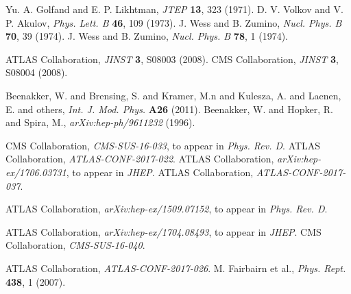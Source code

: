 \documentclass{ws-ijmpcs}
\begin{document}
\begin{thebibliography}{0}    %

 Yu. A. Golfand and E. P. Likhtman, {\it JTEP} {\bf 13}, 323 (1971).
 D. V. Volkov and V. P. Akulov, {\it Phys. Lett. B} {\bf 46}, 109 (1973).
 J. Wess and B. Zumino, {\it Nucl. Phys. B} {\bf 70}, 39 (1974).
 J. Wess and B. Zumino, {\it Nucl. Phys. B} {\bf 78}, 1 (1974).

 ATLAS Collaboration, {\it JINST} {\bf 3}, S08003 (2008).
 CMS Collaboration, {\it JINST} {\bf 3}, S08004 (2008).

 Beenakker, W. and Brensing, S. and Kramer, M.n and Kulesza, A. and Laenen, E. and others, {\it Int. J. Mod. Phys.} {\bf A26} (2011).
 Beenakker, W. and Hopker, R. and Spira, M., {\it arXiv:hep-ph/9611232} (1996).

 CMS Collaboration, {\it CMS-SUS-16-033}, to appear in {\it Phys. Rev. D}.
 ATLAS Collaboration, {\it ATLAS-CONF-2017-022}.%
 ATLAS Collaboration, {\it arXiv:hep-ex/1706.03731}, to appear in {\it JHEP}.
 ATLAS Collaboration, {\it ATLAS-CONF-2017-037}.%

 ATLAS Collaboration, {\it arXiv:hep-ex/1509.07152}, to appear in {\it Phys. Rev. D}.

 ATLAS Collaboration, {\it arXiv:hep-ex/1704.08493}, to appear in {\it JHEP}.
 CMS Collaboration, {\it CMS-SUS-16-040}.%

 ATLAS Collaboration, {\it ATLAS-CONF-2017-026}.%
 M. Fairbairn et al., {\it Phys. Rept.} {\bf 438}, 1 (2007).

\end{thebibliography}
\end{document}
